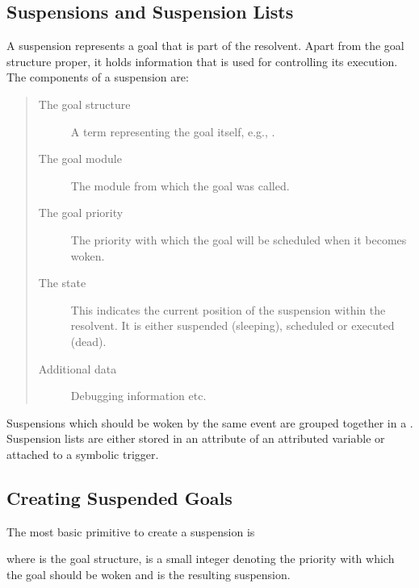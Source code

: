 {

\subsection{Suspensions and Suspension Lists}
A suspension represents a goal that is part of the resolvent.
Apart from the goal structure proper, it holds information that
is used for controlling its execution.
The components of a suspension are:
\begin{quote}
\begin{description}
\item[The goal structure]
        A term representing the goal itself, e.g., .
\item[The goal module]
        The module from which the goal was called.
\item[The goal priority]
        The priority with which the goal will be scheduled when
        it becomes woken.
\item[The state]
        This indicates the current position of the suspension within
        the resolvent. It is either suspended (sleeping), scheduled
	or executed (dead).
\item[Additional data]
	Debugging information etc.
\end{description}
\end{quote}

Suspensions which should be woken by the same event are grouped
together in a .
Suspension lists are either stored in an attribute of
an attributed variable or attached to a symbolic trigger.


\subsection{Creating Suspended Goals}
The most basic primitive to create a suspension is
\begin{quote}
%
\end{quote}
where  is the goal structure,
 is a small integer denoting the priority with which
the goal should be woken and  is the resulting suspension.

}
